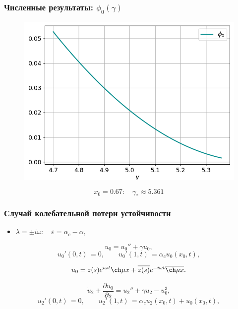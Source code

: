 \documentclass[fullscreen=true, unicode, bookmarks=false]{beamer}
\begin{document}
\begin{frame}
\frametitle{ Численные результаты: $ \phi_0(\gamma) $ }

\begin{figure} 
\includegraphics[scale=0.55]{divergent_phi0_23.png}  
\end{figure}

$$ x_0 = 0.67: \quad \gamma_* \approx 5.361 $$

\end{frame}

\begin{frame}
\frametitle{ Случай колебательной потери устойчивости }

\begin{itemize}
\item { $ \lambda = \pm i \omega: \quad \varepsilon=\alpha_c-\alpha, $
}
\end{itemize}

\medskip

\begin{equation}
	u_0 = u_0'' + \gamma u_0,
\end{equation}
\begin{equation}
	u_0'(0, t) \, = 0, \qquad u_0'(1, t) \, = \alpha_c u_0(x_0, t),
\end{equation}

$$ u_0 = z(s) e^{i \omega t} \ch \mu x + \overline{z(s)} e^{-i \omega t} \overline{\ch \mu x}. $$

\medskip

\begin{equation}
	\dot u_2 + \frac{\partial u_0}{\partial s} = u_2'' + \gamma u_2 - u_0^3,
\end{equation}
\begin{equation}
	u_2'(0, t) \, = 0, \qquad u_2'(1, t) \, = \alpha_c u_2(x_0, t) + u_0(x_0, t),
\end{equation}


\end{frame}
\end{document}

